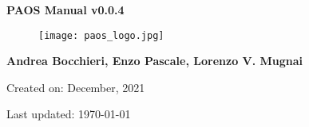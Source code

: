 

\begin{titlepage}

    \centering

    \vspace*{30mm} %
    \textbf{\Huge {PAOS Manual v0.0.4}}

    \vspace{20mm}
    \begin{figure}[!h]
        \centering
        \texttt{[image: paos\_logo.jpg]}
        \label{fig:paos_logo}
    \end{figure}

    \vspace{25mm}
    \Large \textbf{{Andrea Bocchieri, Enzo Pascale, Lorenzo V. Mugnai}}

    \vspace*{8mm}
    \small Created on: December, 2021

    \vspace{2mm}
    \small Last updated: \MonthYearFormat\today


\end{titlepage}

\clearpage
{}
\tableofcontents
\listoffigures
\listoftables
\clearpage
{}